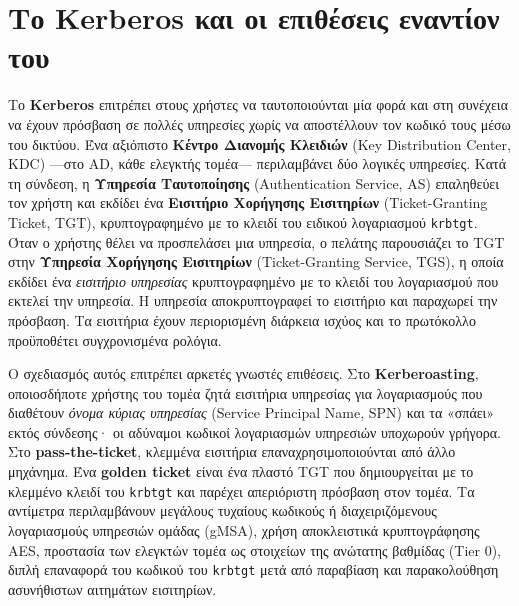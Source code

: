\documentclass[11pt,openany]{book}
\begin{document}
\section{Το Kerberos και οι επιθέσεις εναντίον του}\label{sec:8.5}
Το \textbf{Kerberos} επιτρέπει στους χρήστες να ταυτοποιούνται μία φορά και στη συνέχεια να έχουν πρόσβαση σε πολλές υπηρεσίες χωρίς να αποστέλλουν τον κωδικό τους μέσω του δικτύου. Ένα αξιόπιστο \textbf{Κέντρο Διανομής Κλειδιών} (Key Distribution Center, KDC) —στο AD, κάθε ελεγκτής τομέα— περιλαμβάνει δύο λογικές υπηρεσίες. Κατά τη σύνδεση, η \textbf{Υπηρεσία Ταυτοποίησης} (Authentication Service, AS) επαληθεύει τον χρήστη και εκδίδει ένα \textbf{Εισιτήριο Χορήγησης Εισιτηρίων} (Ticket-Granting Ticket, TGT), κρυπτογραφημένο με το κλειδί του ειδικού λογαριασμού \texttt{krbtgt}. Όταν ο χρήστης θέλει να προσπελάσει μια υπηρεσία, ο πελάτης παρουσιάζει το TGT στην \textbf{Υπηρεσία Χορήγησης Εισιτηρίων} (Ticket-Granting Service, TGS), η οποία εκδίδει ένα \emph{εισιτήριο υπηρεσίας} κρυπτογραφημένο με το κλειδί του λογαριασμού που εκτελεί την υπηρεσία. Η υπηρεσία αποκρυπτογραφεί το εισιτήριο και παραχωρεί την πρόσβαση. Τα εισιτήρια έχουν περιορισμένη διάρκεια ισχύος και το πρωτόκολλο προϋποθέτει συγχρονισμένα ρολόγια.

Ο σχεδιασμός αυτός επιτρέπει αρκετές γνωστές επιθέσεις. Στο \textbf{Kerberoasting}, οποιοσδήποτε χρήστης του τομέα ζητά εισιτήρια υπηρεσίας για λογαριασμούς που διαθέτουν \emph{όνομα κύριας υπηρεσίας} (Service Principal Name, SPN) και τα «σπάει» εκτός σύνδεσης· οι αδύναμοι κωδικοί λογαριασμών υπηρεσιών υποχωρούν γρήγορα. Στο \textbf{pass-the-ticket}, κλεμμένα εισιτήρια επαναχρησιμοποιούνται από άλλο μηχάνημα. Ένα \textbf{golden ticket} είναι ένα πλαστό TGT που δημιουργείται με το κλεμμένο κλειδί του \texttt{krbtgt} και παρέχει απεριόριστη πρόσβαση στον τομέα. Τα αντίμετρα περιλαμβάνουν μεγάλους τυχαίους κωδικούς ή διαχειριζόμενους λογαριασμούς υπηρεσιών ομάδας (gMSA), χρήση αποκλειστικά κρυπτογράφησης AES, προστασία των ελεγκτών τομέα ως στοιχείων της ανώτατης βαθμίδας (Tier 0), διπλή επαναφορά του κωδικού του \texttt{krbtgt} μετά από παραβίαση και παρακολούθηση ασυνήθιστων αιτημάτων εισιτηρίων.
\end{document}
